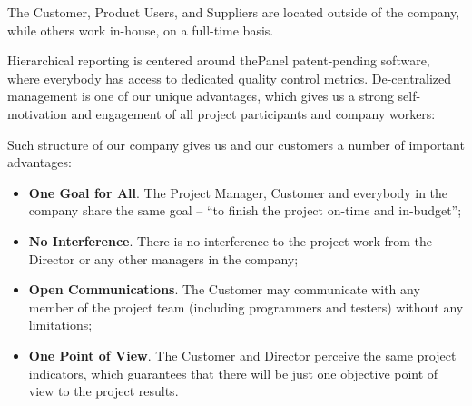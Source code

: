 The Customer, Product Users, and Suppliers are located outside of the company, while
others work in-house, on a full-time basis.

Hierarchical reporting is centered around thePanel patent-pending software, where
everybody has access to dedicated quality control metrics. De-centralized
management is one of our unique advantages, which gives us a strong self-motivation
and engagement of all project participants and company workers:

\begin{center}\end{center}

Such structure of our company gives us and our customers a number
of important advantages:

	\begin{itemize}
	\item \textbf{One Goal for All}. The Project Manager, Customer and everybody in the company share the same
	goal -- ``to finish the project on-time and in-budget'';

	\item \textbf{No Interference}. There is no interference to the project work from the Director or
	any other managers in the company;

	\item \textbf{Open Communications}. The Customer may communicate with any member of the project team (including 
	programmers and testers) without any limitations;

	\item \textbf{One Point of View}. The Customer and Director perceive the same project indicators,
	which guarantees that there will be just one objective point of view to the project results.
	\end{itemize}	
